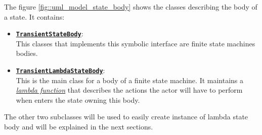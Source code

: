 The figure \ref{fig::uml_model_state_body} shows the classes describing the body of a state. It contains:
\begin{itemize}
	\item 	\underline{\textbf{\texttt{TransientStateBody}}}:\\
	This classes that implements this symbolic interface are finite state machines bodies.
	
	\item 	\underline{\textbf{\texttt{TransientLambdaStateBody}}}:\\
	This is the main class for a body of a finite state machine. It maintains a \href{https://kotlinlang.org/docs/lambdas.html}{\textit{lambda function}} that describes the actions the actor will have to perform when enters the state owning this body.
\end{itemize}
The other two subclasses will be used to easily create instance of lambda state body and will be explained in the next sections.




